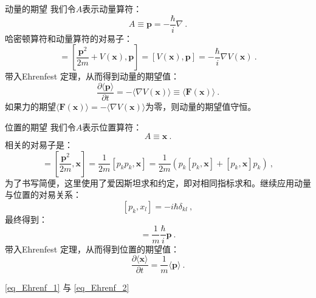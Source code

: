 \begin{example}{动量的期望}
我们令$A$表示动量算符：
\begin{equation}
A \equiv \boldsymbol{p} = -\frac{\hbar}{i} \nabla~.
\end{equation}
哈密顿算符和动量算符的对易子：
\begin{equation}
[H, \boldsymbol{p}]=\left[\frac{\boldsymbol{p}^2}{2 m}+V(\boldsymbol{x}), \boldsymbol{p}\right]=[V(\boldsymbol{x}), \boldsymbol{p}]=-\frac{\hbar}{i} \nabla V(\boldsymbol{x})~.
\end{equation}
带入Ehrenfest 定理，从而得到动量的期望值：
\begin{equation}\label{eq_Ehrenf_1}
\frac{\partial\langle\boldsymbol{p}\rangle}{\partial t}=-\langle\nabla V(\boldsymbol{x})\rangle \equiv\langle\boldsymbol{F}(\boldsymbol{x})\rangle~.
\end{equation}
如果力的期望$\langle\boldsymbol{F}(\boldsymbol{x})\rangle=-\langle\nabla V(\boldsymbol{x})\rangle$为零，则动量的期望值守恒。
\end{example}
\begin{example}{位置的期望}
我们令$A$表示位置算符：
\begin{equation}
A \equiv \boldsymbol{x}~.
\end{equation}
相关的对易子是：
\begin{equation}
[H, \boldsymbol{x}]=\left[\frac{\boldsymbol{p}^2}{2 m}, \boldsymbol{x}\right]=\frac{1}{2 m}\left[p_k p_k, \boldsymbol{x}\right]=\frac{1}{2 m}\left(p_k\left[p_k, \boldsymbol{x}\right]+\left[p_k, \boldsymbol{x}\right] p_k\right)~,
\end{equation}
为了书写简便，这里使用了爱因斯坦求和约定，即对相同指标求和。继续应用动量与位置的对易关系：
\begin{equation}
\left[p_k, x_l\right]=-i \hbar \delta_{k l}~,
\end{equation}
最终得到：
\begin{equation}
[H, \boldsymbol{x}]=\frac{1}{m} \frac{\hbar}{i} \boldsymbol{p}~.
\end{equation}
带入Ehrenfest 定理，从而得到位置的期望值：
\begin{equation}\label{eq_Ehrenf_2}
\frac{\partial\langle\boldsymbol{x}\rangle}{\partial t}=\frac{1}{m}\langle\boldsymbol{p}\rangle ~.
\end{equation}
\end{example}

\autoref{eq_Ehrenf_1} 与 \autoref{eq_Ehrenf_2} 